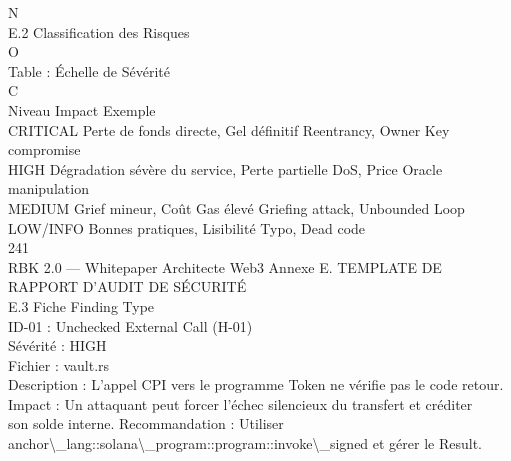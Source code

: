 N\\
E.2 Classification des Risques\\
O\\
\vspace{0.5em}
Table : Échelle de Sévérité\\
C\\
\vspace{0.5em}
\vspace{0.5em}
Niveau   Impact                                         Exemple\\
CRITICAL Perte de fonds directe, Gel définitif          Reentrancy, Owner Key compromise\\
HIGH     Dégradation sévère du service, Perte partielle DoS, Price Oracle manipulation\\
MEDIUM   Grief mineur, Coût Gas élevé                   Griefing attack, Unbounded Loop\\
LOW/INFO Bonnes pratiques, Lisibilité                   Typo, Dead code\\
\vspace{0.5em}
\vspace{0.5em}
\vspace{0.5em}
\vspace{0.5em}
241\\
RBK 2.0 — Whitepaper Architecte Web3                                                             Annexe E. TEMPLATE DE RAPPORT D’AUDIT DE SÉCURITÉ\\
\vspace{0.5em}
\vspace{0.5em}
\vspace{0.5em}
E.3 Fiche Finding Type\\
ID-01 : Unchecked External Call (H-01)\\
\vspace{0.5em}
Sévérité : HIGH\\
Fichier : vault.rs\\
Description : L’appel CPI vers le programme Token ne vérifie pas le code retour. Impact : Un attaquant peut forcer l’échec silencieux du transfert et créditer\\
son solde interne. Recommandation : Utiliser anchor\textbackslash{}_lang::solana\textbackslash{}_program::program::invoke\textbackslash{}_signed et gérer le Result.\\
\vspace{0.5em}
\vspace{0.5em}
\vspace{0.5em}
\vspace{0.5em}
